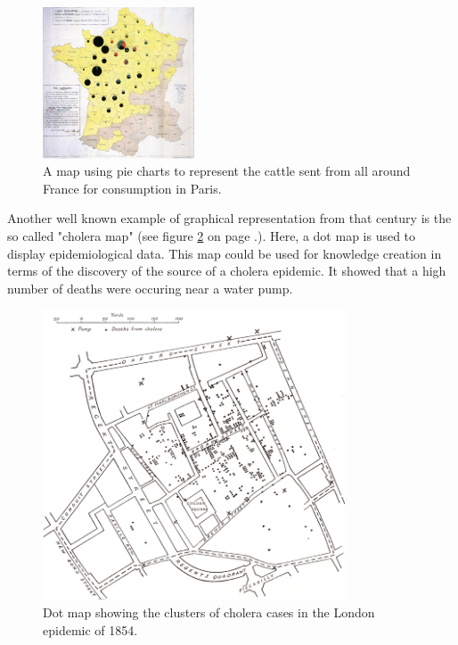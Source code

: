 \begin{figure}[!htb]
\centering
\includegraphics[width=0.4\textwidth,keepaspectratio]{images/history/minard.png}
\caption[
    A map using pie charts to represent the cattle sent from all around France for consumption in Paris., Urldate: 07.2016 \newline
\small\texttt{\url{https://upload.wikimedia.org/wikipedia/commons/1/1c/Minard-carte-viande-1858.png}}
]{A map using pie charts to represent the cattle sent from all around France for consumption in Paris.}
\label{fig:first-mixture}
\end{figure}

Another well known example of graphical representation from that century is the so called "cholera map" (see figure \ref{fig:cholera-map} on page \pageref{fig:cholera-map}.). Here, a dot map is used to display epidemiological data. This map could be used for knowledge creation in terms of the discovery of the source of a cholera epidemic. It showed that a high number of deaths were occuring near a water pump.

\begin{figure}[!htb]
\centering
\includegraphics[width=0.8\textwidth,keepaspectratio]{images/history/cholera2.png}
\caption[
    Dot map showing the clusters of cholera cases in the London epidemic of 1854., Urldate: 07.2016 \newline
\small\texttt{\url{http://datavis.ca/milestones//admin/uploads/images/tufte/snow.gif}}
]{Dot map showing the clusters of cholera cases in the London epidemic of 1854.}
\label{fig:cholera-map}
\end{figure}

